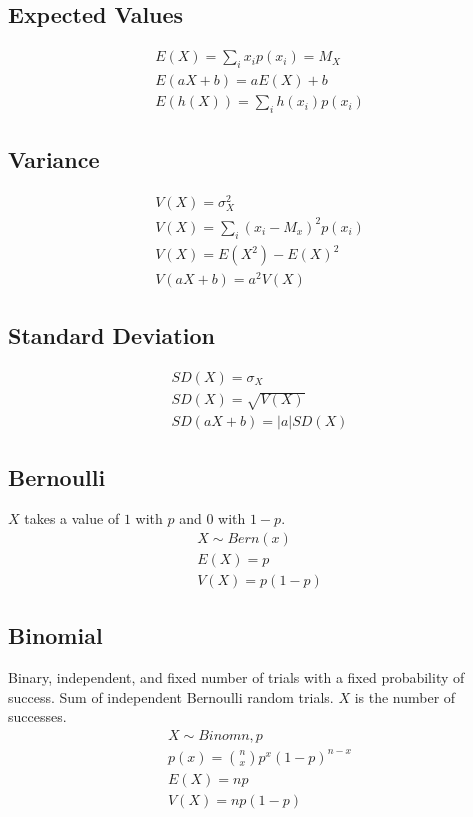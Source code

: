 \subsection{Expected Values}
\begin{align}
  E(X) = \sum_{i}^{} x_ip(x_i) = M_X \\
  E(aX + b) = aE(X) + b \\
  E(h(X)) = \sum_{i}^{} h(x_i)p(x_i)
\end{align}

\subsection{Variance}
\begin{align}
  V(X) = \sigma^2_X \\
  V(X) = \sum_{i}^{}(x_i - M_x)^2p(x_i) \\
  V(X) = E(X^2) - E(X)^2 \\
  V(aX + b) = a^2V(X)
\end{align}

\subsection{Standard Deviation}
\begin{align}
  SD(X) = \sigma_X \\
  SD(X) = \sqrt{V(X)} \\
  SD(aX + b) = \lvert a \rvert SD(X)
\end{align}

\subsection{Bernoulli}
$X$ takes a value of $1$ with $p$ and $0$ with $1-p$.
\begin{align}
  X \sim Bern(x) \\
  E(X) = p \\
  V(X) = p(1 - p)
\end{align}

\subsection{Binomial}
Binary, independent, and fixed number of trials with a fixed probability of success. Sum of independent Bernoulli random trials. $X$ is the number of successes.
\begin{align}
  X \sim Binom{n, p} \\
  p(x) = \binom{n}{x}p^x(1 - p)^{n - x} \\
  E(X) = np \\
  V(X) = np(1 - p)
\end{align}

